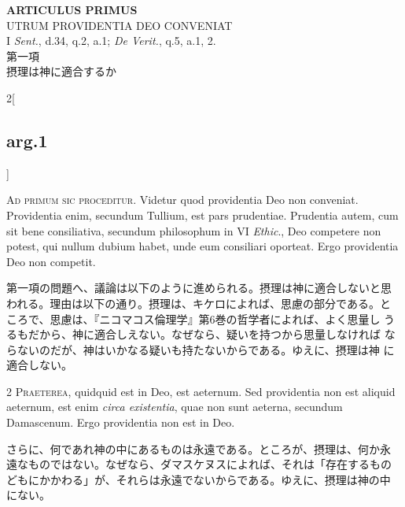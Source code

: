 \documentclass[paper=a4paper,fontsize=10pt,jafontsize=9pt,titlepage]{jlreq}
\begin{document}
\begin{center}
 {\Large {\bfseries ARTICULUS PRIMUS}}\\
 {\large UTRUM PROVIDENTIA DEO CONVENIAT}\\
 {\footnotesize I {\itshape Sent.}, d.34, q.2, a.1; {\itshape De
 Verit.}, q.5, a.1, 2.}\\
 {\Large 第一項\\摂理は神に適合するか}
\end{center}

\begin{paracol}{2}[\subsection{arg.1}]

{\Huge A}{\scshape d primum sic proceditur}. Videtur quod
providentia Deo non conveniat. Providentia enim, secundum Tullium, est
pars prudentiae. Prudentia autem, cum sit bene consiliativa, secundum
philosophum in VI {\itshape Ethic}., Deo competere non potest, qui nullum dubium
habet, unde eum consiliari oporteat. Ergo providentia Deo non competit.

\switchcolumn

第一項の問題へ、議論は以下のように進められる。摂理は神に適合しないと思
われる。理由は以下の通り。摂理は、キケロによれば、思慮の部分である。と
ころで、思慮は、『ニコマコス倫理学』第6巻の哲学者によれば、よく思量し
うるもだから、神に適合しえない。なぜなら、疑いを持つから思量しなければ
ならないのだが、神はいかなる疑いも持たないからである。ゆえに、摂理は神
に適合しない。


{\scshape 2 Praeterea}, quidquid est in Deo, est
aeternum. Sed providentia non est aliquid aeternum, est enim {\itshape circa
existentia}, quae non sunt aeterna, secundum Damascenum. Ergo providentia
non est in Deo.

\switchcolumn

さらに、何であれ神の中にあるものは永遠である。ところが、摂理は、何か永
遠なものではない。なぜなら、ダマスケヌスによれば、それは「存在するもの
どもにかかわる」が、それらは永遠でないからである。ゆえに、摂理は神の中
にない。



\end{paracol}
\end{document}
